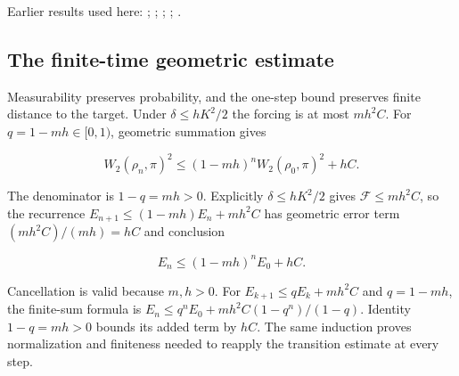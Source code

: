 \documentclass[11pt,a4paper]{report}
\begin{document}
Earlier results used here: \cite[Section~3.17.3]{LangevinLean2026ULASC}; \cite[Section~3.17.4]{LangevinLean2026ULASC}; \cite[Section~3.18.2]{LangevinLean2026ULASC}; \cite[Section~3.26.3]{LangevinLean2026ULASC}; \cite[Section~3.33.5]{LangevinLean2026ULASC}.
\subsection{\texorpdfstring{The finite-time geometric estimate}{The finite-time geometric estimate}}
\label{report-step-ProximalLangevin-SplittingEndpoint-lean-2}


Measurability preserves probability, and the one-step bound preserves finite distance to the target. Under \(\delta\le hK^2/2\) the forcing is at most \(mh^2C\). For \(q=1-mh\in[0,1)\), geometric summation gives

\[W_2(\rho_n,\pi)^2\le(1-mh)^nW_2(\rho_0,\pi)^2+hC.\]

The denominator is \(1-q=mh>0\). Explicitly \(\delta\le hK^2/2\) gives \(\mathcal F\le mh^2C\), so the recurrence \(E_{n+1}\le(1-mh)E_n+mh^2C\) has geometric error term \((mh^2C)/(mh)=hC\) and conclusion

\[E_n\le(1-mh)^nE_0+hC.\]

Cancellation is valid because \(m,h>0\). For \(E_{k+1}\le qE_k+mh^2C\) and \(q=1-mh\), the finite-sum formula is \(E_n\le q^nE_0+mh^2C(1-q^n)/(1-q)\). Identity \(1-q=mh>0\) bounds its added term by \(hC\). The same induction proves normalization and finiteness needed to reapply the transition estimate at every step.
\end{document}
